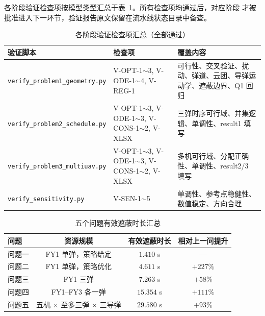\documentclass[12pt, a4paper]{article}
\begin{document}
各阶段验证检查项按模型类型汇总于表~\ref{tab:verifysum}。所有检查项均通过后，对应阶段
才被批准进入下一环节，验证报告原文保留在流水线状态目录中备查。

\begin{table}[H]
\centering
\caption{各阶段验证检查项汇总（全部通过）}
\label{tab:verifysum}
\small
\begin{tabular}{>{\raggedright\arraybackslash}p{3.1cm}>{\raggedright\arraybackslash}p{3.6cm}>{\raggedright\arraybackslash}p{7.2cm}}
\toprule
\textbf{验证脚本} & \textbf{检查项} & \textbf{覆盖内容} \\
\midrule
\texttt{verify\_\allowbreak problem1\_\allowbreak geometry.py} & V-OPT-1$\sim$3, V-ODE-1$\sim$4, V-REG-1 & 可行性、交叉验证、扰动、弹道、云团、导弹运动学、遮蔽边界、Q1 回归 \\
\texttt{verify\_\allowbreak problem2\_\allowbreak schedule.py} & V-OPT-1$\sim$3, V-ODE-1$\sim$3, V-CONS-1$\sim$2, V-XLSX & 三弹时序可行域、并集逻辑、单调性、result1 填写 \\
\texttt{verify\_\allowbreak problem3\_\allowbreak multiuav.py} & V-OPT-1$\sim$3, V-ODE-1$\sim$3, V-CONS-1$\sim$2, V-XLSX & 多机可行域、分配正确性、单调性、result2/3 填写 \\
\texttt{verify\_\allowbreak sensitivity.py} & V-SEN-1$\sim$5 & 单调性、参考点稳健性、数值稳定、方向合理 \\
\bottomrule
\end{tabular}
\end{table}

\begin{table}[H]
\centering
\caption{五个问题有效遮蔽时长汇总}
\label{tab:summary}
\begin{tabular}{lccc}
\toprule
\textbf{问题} & \textbf{资源规模} & \textbf{有效遮蔽时长} & \textbf{相对上一问提升} \\
\midrule
问题一 & FY1 单弹，策略给定 & $1.410$ s & --- \\
问题二 & FY1 单弹，策略优化 & $4.611$ s & $+227\%$ \\
问题三 & FY1 三弹 & $7.263$ s & $+58\%$ \\
问题四 & FY1--FY3 各一弹 & $15.354$ s & $+111\%$ \\
问题五 & 五机 $\times$ 至多三弹 $\times$ 三导弹 & $29.580$ s & $+93\%$ \\
\bottomrule
\end{tabular}
\end{table}
\end{document}
